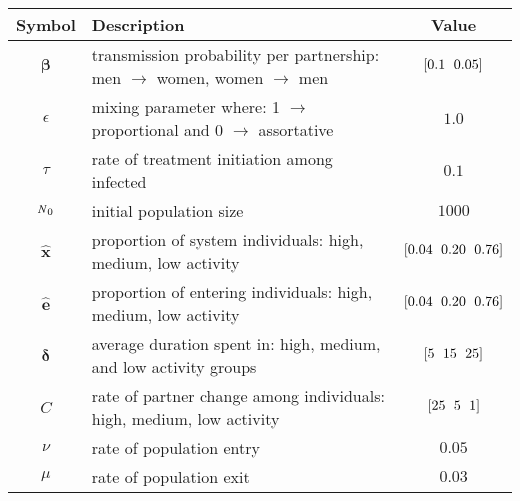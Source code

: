 \begin{tabular}{clc}
	\toprule
	    Symbol     & Description                                                                                             &          Value          \\
	\midrule
	 $\bm{\beta}$  & transmission probability per partnership: men $\rightarrow$ women, women $\rightarrow$ men              &    $\tarr{0.1,0.05}$    \\
	  $\epsilon$   & mixing parameter where: 1 $\rightarrow$ proportional and 0 $\rightarrow$ assortative \cite{Garnett1994} &          $1.0$          \\
	    $\tau$     & rate of treatment initiation among infected                                                             &          $0.1$          \\
	    ${\mbox{\footnotesize{\textit{N}}}}_0$     & initial population size                                                                                 &         $1000$          \\
	\midrule
	$\bm{\hat{x}}$ & proportion of system individuals: high, medium, low activity                                            & $\tarr{0.04,0.20,0.76}$ \\
	$\bm{\hat{e}}$ & proportion of entering individuals: high, medium, low activity                                          & $\tarr{0.04,0.20,0.76}$ \\
	$\bm{\delta}$  & average duration spent in: high, medium, and low activity groups                                        &    $\tarr{5,15,25}$     \\
	     $C$       & rate of partner change among individuals: high, medium, low activity                                    &     $\tarr{25,5,1}$     \\
	    $\nu$      & rate of population entry                                                                                &         $0.05$          \\
	    $\mu$      & rate of population exit                                                                                 &         $0.03$          \\
	\bottomrule
\end{tabular}